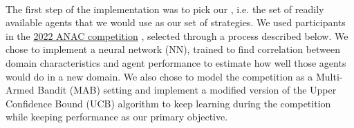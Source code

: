 \paragraph*{}
The first step of the implementation was to pick our , i.e. the set of readily available agents that we would use as our set of strategies. We used participants in the \href{https://web.tuat.ac.jp/~katfuji/ANAC2022/}{2022 ANAC competition} \cite{ANAC}, selected through a process described below. We chose to implement a neural network (NN), trained to find correlation between domain characteristics and agent performance to estimate how well those agents would do in a new domain. We also chose to model the competition as a Multi-Armed Bandit (MAB) %
setting and implement a modified version of the Upper Confidence Bound (UCB) algorithm to keep learning during the competition while keeping performance as our primary objective.

